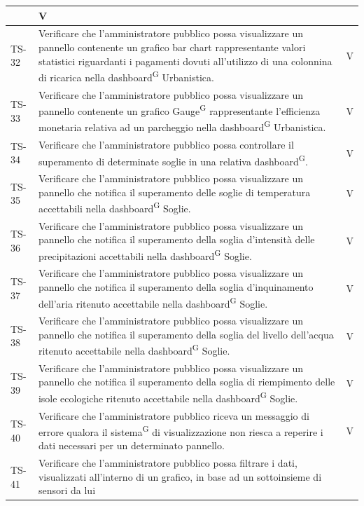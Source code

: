 \documentclass[8pt]{article}
\newcommand{\glossterm}[1]{#1\textsuperscript{G}} %
\begin{document}
\begin{longtable}{|>{\centering}p{2cm}|>{\RaggedRight}m{12cm}|>{\centering\arraybackslash}p{2cm}|}
    & V \\
    \hline
    TS-32 & Verificare che l'amministratore pubblico possa visualizzare un pannello contenente
    un grafico bar chart rappresentante valori statistici riguardanti i pagamenti dovuti all'utilizzo di una colonnina di ricarica nella \glossterm{dashboard} Urbanistica.
    & V \\
    TS-33 & Verificare che l'amministratore pubblico possa visualizzare un pannello contenente
    un grafico \glossterm{Gauge} rappresentante l'efficienza monetaria relativa ad un parcheggio nella \glossterm{dashboard} Urbanistica.
    & V \\
    \hline
    TS-34 & Verificare che l'amministratore pubblico possa controllare il superamento di determinate soglie in una relativa \glossterm{dashboard}. &
    V \\
    \hline
    TS-35 & Verificare che l'amministratore pubblico possa visualizzare un pannello che notifica il superamento delle soglie di temperatura accettabili nella \glossterm{dashboard} Soglie. &
    V \\
    \hline
    TS-36 &Verificare che l'amministratore pubblico possa visualizzare un pannello che notifica il superamento della soglia d'intensità delle precipitazioni accettabili nella \glossterm{dashboard} Soglie. &
    V \\
    \hline
    TS-37 & Verificare che l'amministratore pubblico possa visualizzare un pannello che notifica il superamento della soglia d'inquinamento dell'aria ritenuto accettabile nella \glossterm{dashboard} Soglie. &
    V \\
    \hline
    TS-38 & Verificare che l'amministratore pubblico possa visualizzare un pannello che notifica il superamento della soglia del livello dell'acqua ritenuto accettabile nella \glossterm{dashboard} Soglie. &
    V \\
    \hline
    TS-39 & Verificare che l'amministratore pubblico possa visualizzare un pannello che notifica il superamento della soglia di riempimento delle isole ecologiche ritenuto accettabile nella \glossterm{dashboard} Soglie. &
    V \\
    \hline
    TS-40 & Verificare che l'amministratore pubblico riceva un messaggio di errore qualora il
    \glossterm{sistema} di visualizzazione non riesca a reperire i dati necessari per un determinato pannello. &
    V \\
    \hline
    TS-41 & Verificare che l'amministratore pubblico possa filtrare i dati, visualizzati
    all’interno di un grafico, in base ad un sottoinsieme di sensori da lui

\end{longtable}
\end{document}
